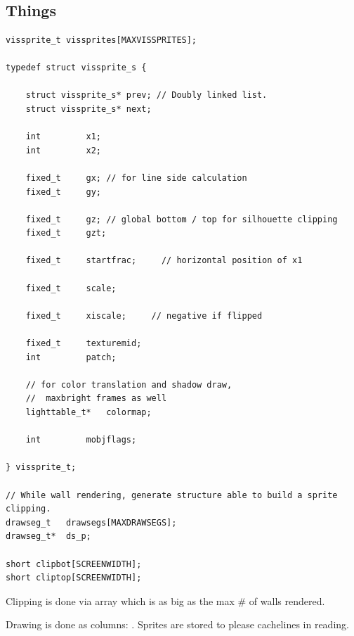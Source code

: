 \\

\\

\\

\par

\subsection{Things}
\begin{verbatim}
vissprite_t	vissprites[MAXVISSPRITES];

typedef struct vissprite_s {
    
    struct vissprite_s*	prev; // Doubly linked list.
    struct vissprite_s*	next;
    
    int			x1;
    int			x2;
    
    fixed_t		gx; // for line side calculation
    fixed_t		gy;		

    fixed_t		gz; // global bottom / top for silhouette clipping
    fixed_t		gzt;

    fixed_t		startfrac;     // horizontal position of x1
    
    fixed_t		scale;
        
    fixed_t		xiscale;	 // negative if flipped

    fixed_t		texturemid;
    int			patch;

    // for color translation and shadow draw,
    //  maxbright frames as well
    lighttable_t*	colormap;
   
    int			mobjflags;
    
} vissprite_t;

// While wall rendering, generate structure able to build a sprite clipping.
drawseg_t	drawsegs[MAXDRAWSEGS];
drawseg_t*	ds_p;

short clipbot[SCREENWIDTH];
short cliptop[SCREENWIDTH];

\end{verbatim}

Clipping is done via  array which is as big as the max \# of walls rendered.\\
\par
Drawing is done as columns: . Sprites are stored to please cachelines in reading.








